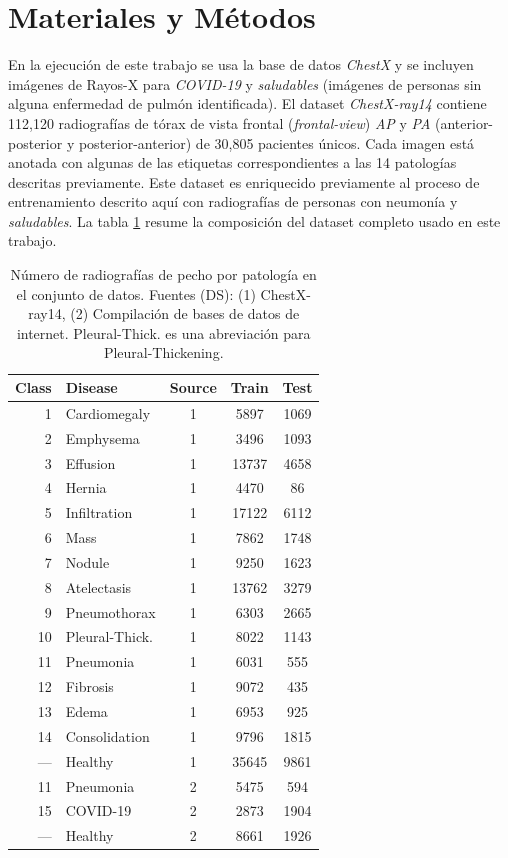 \section{Materiales y Métodos}
En la ejecución de este trabajo se usa la base de datos \textit{ChestX} \cite{wang2017chestx} y se
incluyen imágenes de Rayos-X para \textit{COVID-19} y \textit{saludables} (imágenes de personas sin
alguna enfermedad de pulmón identificada). El dataset \textit{ChestX-ray14} contiene 112,120
radiografías de tórax de vista frontal (\textit{frontal-view}) \textit{AP} y \textit{PA}
(anterior-posterior y posterior-anterior) de 30,805 pacientes únicos. Cada imagen está anotada con
algunas de las etiquetas correspondientes a las 14 patologías descritas previamente. Este dataset es
enriquecido previamente al proceso de entrenamiento descrito aquí con radiografías de personas con
neumonía y \textit{saludables}. La tabla \ref{table_dataset} resume la composición del dataset
completo usado en este trabajo.


\begin{table}[!ht]
    \centering
    \begin{tabular}{| r |l | c | c | c |}
     \hline
     Class & Disease & Source & Train & Test  \\
     \hline\hline
     1  & Cardiomegaly       & 1 & 5897  & 1069 \\
     2  & Emphysema          & 1 & 3496  & 1093 \\
     3  & Effusion           & 1 & 13737 & 4658 \\
     4  & Hernia             & 1 & 4470  & 86   \\
     5  & Infiltration       & 1 & 17122 & 6112 \\
     6  & Mass               & 1 & 7862  & 1748 \\
     7  & Nodule             & 1 & 9250  & 1623 \\
     8  & Atelectasis        & 1 & 13762 & 3279 \\
     9  & Pneumothorax       & 1 & 6303  & 2665 \\
     10 & Pleural-Thick.     & 1 & 8022  & 1143 \\
     11 & Pneumonia          & 1 & 6031  & 555  \\
     12 & Fibrosis           & 1 & 9072  & 435  \\
     13 & Edema              & 1 & 6953  & 925  \\
     14 & Consolidation      & 1 & 9796  & 1815 \\
     ---&  Healthy           & 1 & 35645 & 9861 \\
     \hline
     11 & Pneumonia          & 2 & 5475  & 594  \\
     15 & COVID-19           & 2 & 2873  & 1904 \\
     ---&  Healthy           & 2 & 8661  & 1926 \\
     \hline
    \end{tabular}
    \caption{Número de radiografías de pecho por patología en el conjunto de datos. Fuentes (DS): (1) ChestX-ray14,
             (2) Compilación de bases de datos de internet. Pleural-Thick. es una abreviación para Pleural-Thickening.}
    \label{table_dataset}
\end{table}

